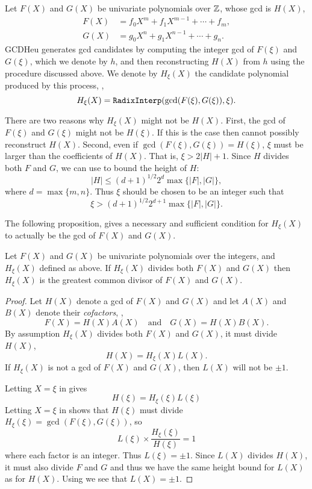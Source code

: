 \medskip
Let $F(X)$ and $G(X)$ be univariate polynomials over $\mathbb{Z}$, whose {\sc gcd}
is $H(X)$,
\[
\begin{aligned}
F(X) &= f_0 X^m + f_1 X^{m-1} + \cdots + f_m, \\
G(X) &= g_0 X^n + g_1 X^{n-1} + \cdots + g_n.
\end{aligned}
\]
GCDHeu generates {\sc gcd} candidates by computing the integer {\sc gcd} of
$F(\xi)$ and $G(\xi)$, which we denote by $h$, and then reconstructing
$H(X)$ from $h$ using the procedure discussed above.  We denote by
$H_{\xi}(X)$ the candidate polynomial produced by this process, \ie,
\[
H_{\xi}(X) = \mbox{\tt RadixInterp}(\gcd(F(\xi), G(\xi)), \xi).
\]

There are two reasons why $H_{\xi}(X)$ might not be $H(X)$.  First,
the {\sc gcd} of $F(\xi)$ and $G(\xi)$ might not be $H(\xi)$.  If this is
the case then  cannot possibly reconstruct $H(X)$.
Second, even if $\gcd(F(\xi), G(\xi)) = H(\xi)$, $\xi$ must be larger
than the coefficients of $H(X)$.  That is, $\xi > 2|H|+1$.  Since $H$
divides both $F$ and $G$, we can use 
to bound the height of $H$:
\[
|H| \le (d+1)^{1/2} 2^d \max\{ |F|, |G| \},
\]
where $d = \max \{m, n\}$.  Thus $\xi$ should be chosen to be an
integer such that
\[
\xi > (d+1)^{1/2} 2^{d+1} \max\{ |F|, |G| \}.
\]

The following proposition, gives a necessary and sufficient condition
for $H_{\xi}(X)$ to actually be the {\sc gcd} of $F(X)$ and $G(X)$.

\begin{proposition}
Let $F(X)$ and $G(X)$ be univariate polynomials over the integers, and
$H_{\xi}(X)$ defined as above.  If $H_{\xi}(X)$ divides both $F(X)$
and $G(X)$ then $H_{\xi}(X)$ is the greatest common divisor of $F(X)$
and $G(X)$.
\end{proposition}

\begin{proof}
Let $H(X)$ denote a {\sc gcd} of $F(X)$ and $G(X)$ and let $A(X)$ and
$B(X)$ denote their {\em cofactors}, \ie,
\begin{equation} \label{PGCD:HeuGCD:Eqa}
F(X) = H(X) A(X) \quad \mbox{and} \quad G(X) = H(X) B(X).
\end{equation}
By assumption $H_{\xi}(X)$ divides both $F(X)$ and $G(X)$, it must
divide $H(X)$,
\begin{equation} \label{PGCD:HeuGCD:Eqb}
H(X) = H_{\xi}(X) L(X).
\end{equation}
If $H_{\xi}(X)$ is not a {\sc gcd} of $F(X)$ and $G(X)$, then $L(X)$ will
not be $\pm 1$.

Letting $X= \xi$ in  gives
\[
H(\xi) = H_{\xi}(\xi) L(\xi)
\]
Letting $X = \xi$ in  shows that $H(\xi)$ must
divide $H_{\xi}(\xi) = \gcd(F(\xi), G(\xi))$, so
\[
L(\xi) \times \frac{H_{\xi}(\xi)}{H(\xi)} = 1
\]
where each factor is an integer.  Thus $L(\xi) = \pm 1$.  Since $L(X)$
divides $H(X)$, it must also divide $F$ and $G$ and thus we have the
same height bound for $L(X)$ as for $H(X)$.   Using 
we see that $L(X) = \pm 1$.
\end{proof}

